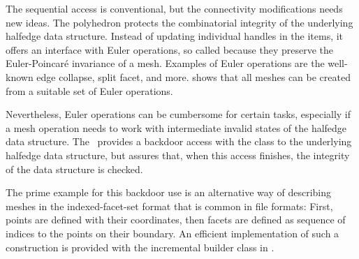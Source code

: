 \noindent
The sequential access is conventional, but the connectivity
modifications needs new ideas. The polyhedron protects the
combinatorial integrity of the underlying halfedge data structure.
Instead of updating individual handles in the items, it offers an
interface with Euler operations, so called because they preserve the
Euler-Poincar\'e invariance of a mesh. Examples of Euler operations
are the well-known edge collapse, split facet, and more.
\cite{Maentylae88} shows that all meshes can be created from a
suitable set of Euler operations.

Nevertheless, Euler operations can be cumbersome for certain tasks,
especially if a mesh operation needs to work with intermediate invalid
states of the halfedge data structure. The \cgalpoly\ provides a
backdoor access with the  class to the
underlying halfedge data structure, but assures that, when this access
finishes, the integrity of the data structure is checked.

The prime example for this backdoor use is an alternative way of
describing meshes in the indexed-facet-set format that is common in file
formats: First, points are defined with their coordinates, then facets
are defined as sequence of indices to the points on their boundary. An
efficient implementation of such a construction is provided with the
incremental builder class in \cgal. 









